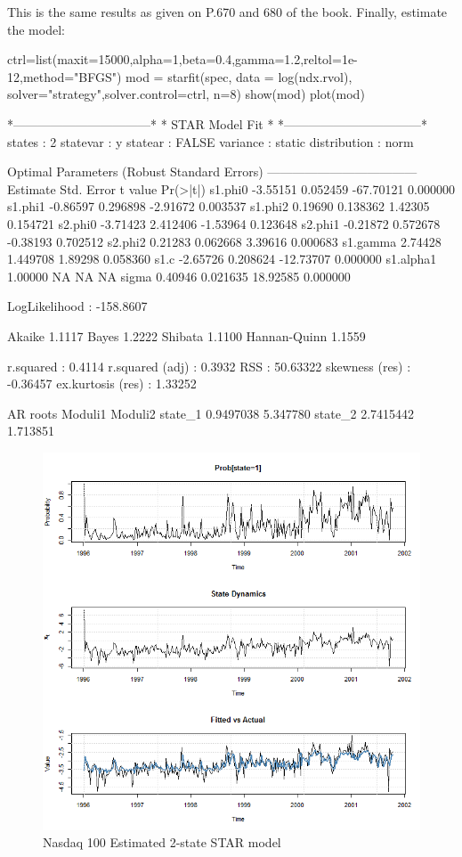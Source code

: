 This is the same results as given on P.670 and 680 of the \cite{Zivot2007} book.
Finally, estimate the model:
\begin{Schunk}
\begin{Sinput}
ctrl=list(maxit=15000,alpha=1,beta=0.4,gamma=1.2,reltol=1e-12,method="BFGS")
mod = starfit(spec, data = log(ndx.rvol),
solver="strategy",solver.control=ctrl, n=8)
show(mod)
plot(mod)
\end{Sinput}
\begin{Soutput}
*---------------------------------*
*          STAR Model Fit         *
*---------------------------------*
states       : 2
statevar     : y
statear      : FALSE
variance     : static
distribution : norm

Optimal Parameters (Robust Standard Errors)
------------------------------------
           Estimate  Std. Error   t value Pr(>|t|)
s1.phi0    -3.55151    0.052459 -67.70121 0.000000
s1.phi1    -0.86597    0.296898  -2.91672 0.003537
s1.phi2     0.19690    0.138362   1.42305 0.154721
s2.phi0    -3.71423    2.412406  -1.53964 0.123648
s2.phi1    -0.21872    0.572678  -0.38193 0.702512
s2.phi2     0.21283    0.062668   3.39616 0.000683
s1.gamma    2.74428    1.449708   1.89298 0.058360
s1.c       -2.65726    0.208624 -12.73707 0.000000
s1.alpha1   1.00000          NA        NA       NA
sigma       0.40946    0.021635  18.92585 0.000000

LogLikelihood : -158.8607 
                   
Akaike       1.1117
Bayes        1.2222
Shibata      1.1100
Hannan-Quinn 1.1559

r.squared         :  0.4114
r.squared (adj)   :  0.3932
RSS               :  50.63322
skewness (res)    :  -0.36457
ex.kurtosis (res) :  1.33252

AR roots
          Moduli1  Moduli2
state_1 0.9497038 5.347780
state_2 2.7415442 1.713851
\end{Soutput}
\end{Schunk}
\begin{figure}[ht]
\centering
\includegraphics[scale=0.35]{ndxfit}
\caption{Nasdaq 100 Estimated 2-state STAR model}
\label{fig:ndxfit}
\end{figure}